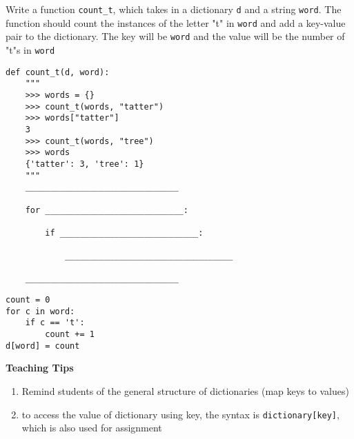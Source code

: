 \begin{blocksection}
\question Write a function \lstinline$count_t$, which takes in a dictionary \lstinline$d$ and a string \lstinline$word$.
The function should count the instances of the letter "t" in \lstinline$word$ and add a key-value pair to the dictionary.
The key will be \lstinline$word$ and the value will be the number of "t"s in \lstinline$word$

\begin{lstlisting}
def count_t(d, word):
    """
    >>> words = {}
    >>> count_t(words, "tatter")
    >>> words["tatter"]
    3
    >>> count_t(words, "tree")
    >>> words
    {'tatter': 3, 'tree': 1}
    """
    _______________________________
    
    for ____________________________:

        if ____________________________:

            __________________________________

    _______________________________

\end{lstlisting}

\begin{solution}
\begin{lstlisting}
count = 0
for c in word:
    if c == 't':
        count += 1
d[word] = count
\end{lstlisting}
\end{solution}

\begin{blocksection}
    \begin{meta}
    \textbf{Teaching Tips}
    \begin{enumerate}
            \item Remind students of the general structure of dictionaries (map keys to values)
            \item to access the value of dictionary using key, the syntax is \lstinline$dictionary[key]$, which is also used for assignment
    \end{enumerate}
    \end{meta}
\end{blocksection}

\end{blocksection}
    
    